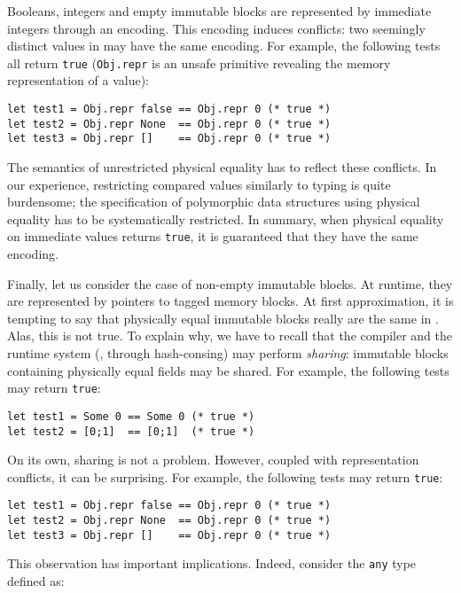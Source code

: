 Booleans, integers and empty immutable blocks are represented by immediate integers through an encoding.
This encoding induces conflicts: two seemingly distinct values in \Rocq may have the same encoding.
For example, the following tests all return \texttt{true} (\texttt{Obj.repr} is an unsafe primitive revealing the memory representation of a value):

\begin{verbatim}
let test1 = Obj.repr false == Obj.repr 0 (* true *)
let test2 = Obj.repr None  == Obj.repr 0 (* true *)
let test3 = Obj.repr []    == Obj.repr 0 (* true *)
\end{verbatim}

The semantics of unrestricted physical equality has to reflect these conflicts.
In our experience, restricting compared values similarly to typing is quite burdensome; the specification of polymorphic data structures using physical equality has to be systematically restricted.
In summary, when physical equality on immediate values returns \texttt{true}, it is guaranteed that they have the same encoding.

Finally, let us consider the case of non-empty immutable blocks.
At runtime, they are represented by pointers to tagged memory blocks.
At first approximation, it is tempting to say that physically equal immutable blocks really are the same in \Rocq.
Alas, this is not true.
To explain why, we have to recall that the \OCaml compiler and the runtime system (\eg, through hash-consing) may perform \emph{sharing}: immutable blocks containing physically equal fields may be shared.
For example, the following tests may return \texttt{true}:

\begin{verbatim}
let test1 = Some 0 == Some 0 (* true *)
let test2 = [0;1]  == [0;1]  (* true *)
\end{verbatim}

On its own, sharing is not a problem.
However, coupled with representation conflicts, it can be surprising.
For example, the following tests may return \texttt{true}:

\begin{verbatim}
let test1 = Obj.repr false == Obj.repr 0 (* true *)
let test2 = Obj.repr None  == Obj.repr 0 (* true *)
let test3 = Obj.repr []    == Obj.repr 0 (* true *)
\end{verbatim}

This observation has important implications.
Indeed, consider the \texttt{any} type defined as:


